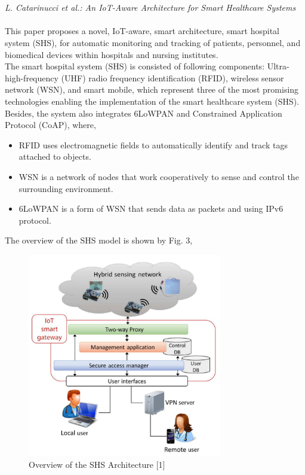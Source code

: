 \documentclass[conference]{IEEEtran}
\begin{document}
\\
\\
\textit{L. Catarinucci et al.: An IoT-Aware Architecture for Smart Healthcare Systems}
\\
\\
\text{\quad} This paper proposes a novel, IoT-aware, smart architecture, smart hospital system (SHS), for automatic monitoring and tracking of patients, personnel, and biomedical devices within hospitals and nursing institutes. \\
\text{\quad} The smart hospital system (SHS) is consisted of following components: Ultra-high-frequency (UHF) radio frequency identification (RFID), wireless sensor network (WSN), and smart mobile, which represent three of the most promising technologies enabling the implementation of the smart healthcare system (SHS). Besides, the system also integrates 6LoWPAN and Constrained Application Protocol (CoAP), where,
\begin{itemize}
\item RFID uses electromagnetic fields to automatically identify and track tags attached to objects.
\item WSN is a network of nodes that work cooperatively to sense and control the surrounding environment.
\item 6LoWPAN is a form of WSN that sends data as packets and using IPv6 protocol.
\end{itemize}
\text{\quad} The overview of the SHS model is shown by Fig. 3, 
\begin{figure}[htbp]
\centerline{\includegraphics[width=8.5cm]{3.png}}
\caption{Overview of the SHS Architecture [1]}
\label{fig}
\end{figure}\\
\end{document}
